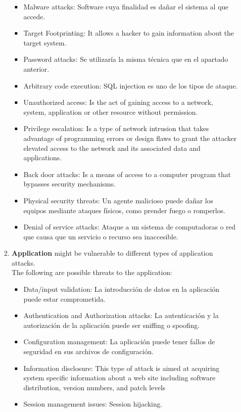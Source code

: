 \begin{enumerate}
\begin{enumerate}
		\begin{itemize}
			\item Malware attacks: Software cuya finalidad es dañar el sistema al que accede.
			\item Target Footprinting: It allows a hacker to gain information about the target system.
			\item Password attacks: Se utilizaría la misma técnica que en el apartado anterior.
			\item Arbitrary code execution: SQL injection es uno de los tipos de ataque.
			\item Unauthorized access: Is the act of gaining access to a network, system, application or other resource without permission.
			\item Privilege escalation: Is a type of network intrusion that takes advantage of programming errors or design flaws to grant the attacker elevated access to the network and its associated data and applications. 
			\item Back door attacks: Is a means of access to a computer program that bypasses security mechanisms.
			\item Physical security threats: Un agente malicioso puede dañar los equipos mediante ataques físicos, como prender fuego o romperlos.
			\item Denial of service attacks: Ataque a un sistema de computadoras o red que causa que un servicio o recurso sea inaccesible.
		\end{itemize}
	\newpage
		\item \textbf{Application} might be vulnerable to different types of application attacks.\\
		The following are possible threats to the application:
		\begin{itemize}
			\item Data/input validation: La introducción de datos en la aplicación puede estar comprometida.
			\item Authentication and Authorization attacks: La autenticación y la autorización de la aplicación puede ser sniffing o spoofing.
			\item Configuration management: La aplicación puede tener fallos de seguridad en sus archivos de configuración.
			\item Information disclosure: This type of attack is aimed at acquiring system specific information about a web site including software distribution, version numbers, and patch levels
			\item Session management issues: Session hijacking.

\end{itemize}
\end{enumerate}
\end{enumerate}
